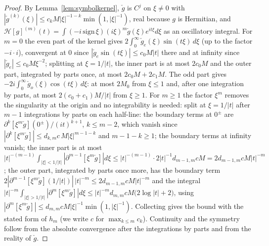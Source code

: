 \documentclass[11pt]{article}
\theoremstyle{definition}
\theoremstyle{remark}
\begin{document}
\begin{proof}
By Lemma~\ref{lem:symbolkernel}, $\check g$ is $C^j$ on $\xi\ne0$ with $|\check g^{(k)}(\xi)|\le c_kM|\xi|^{-1-k}\min(1,|\xi|^{-1})$, real because $g$ is Hermitian, and $\mathcal H[g]^{(m)}(t)=\int(-i\,\mathrm{sign}\,\xi)(i\xi)^m\check g(\xi)e^{it\xi}d\xi$ as an oscillatory integral. For $m=0$ the even part of the kernel gives $2\int_0^\infty\check g_e(\xi)\sin(t\xi)\,d\xi$ (up to the factor $-i\cdot i$), convergent at $0$ since $|\check g_e\sin(t\xi)|\le c_0M|t|$ there and at infinity since $|\check g_e|\le c_0M\xi^{-2}$; splitting at $\xi=1/|t|$, the inner part is at most $2c_0M$ and the outer part, integrated by parts once, at most $2c_0M+2c_1M$. The odd part gives $-2i\int_0^\infty\check g_o(\xi)\cos(t\xi)\,d\xi$: at most $2M_0$ from $\xi\le1$ and, after one integration by parts, at most $2(c_0+c_1)M/|t|$ from $\xi\ge1$. For $m\ge1$ the factor $\xi^m$ removes the singularity at the origin and no integrability is needed: split at $\xi=1/|t|$ after $m-1$ integrations by parts on each half-line: the boundary terms at $0^\pm$ are $\partial^k[\xi^m\check g](0^\pm)/(it)^{k+1}$, $k\le m-2$, which vanish since $|\partial^k[\xi^m\check g]|\le d_{k,m}c\,M|\xi|^{m-1-k}$ and $m-1-k\ge1$; the boundary terms at infinity vanish; the inner part is at most $|t|^{-(m-1)}\int_{|\xi|<1/|t|}|\partial^{m-1}[\xi^m\check g]|d\xi\le|t|^{-(m-1)}\cdot2|t|^{-1}d_{m-1,m}cM=2d_{m-1,m}cM|t|^{-m}$; the outer part, integrated by parts once more, has the boundary term $2|\partial^{m-1}[\xi^m\check g](1/|t|)|\,|t|^{-m}\le2d_{m-1,m}cM|t|^{-m}$ and the integral $|t|^{-m}\int_{|\xi|>1/|t|}|\partial^m[\xi^m\check g]|d\xi\le|t|^{-m}d_{m,m}cM\big(2\log|t|+2\big)$, using $|\partial^m[\xi^m\check g]|\le d_{m,m}cM|\xi|^{-1}\min(1,|\xi|^{-1})$. Collecting gives the bound with the stated form of $h_m$ (we write $c$ for $\max_{k\le m}c_k$). Continuity and the symmetry follow from the absolute convergence after the integrations by parts and from the reality of $\check g$.


\end{proof}
\end{document}
